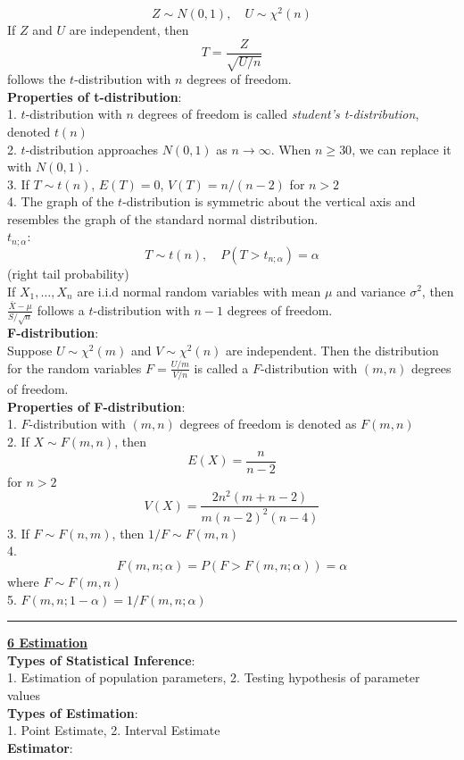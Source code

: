 \documentclass{article}
\begin{document}
\begin{multicols*}{3}
$$Z\sim N(0,1),\quad U\sim \chi^2(n)$$
If $Z$ and $U$ are independent, then $$T=\frac{Z}{\sqrt{U/n}}$$ follows the $t$-distribution with $n$ degrees of freedom.\\
\textbf{Properties of t-distribution}:\\
1. $t$-distribution with $n$ degrees of freedom is called \textit{student's t-distribution}, denoted $t(n)$\\
2. $t$-distribution approaches $N(0,1)$ as $n\to\infty$. When $n\geq 30$, we can replace it with $N(0,1)$.\\
3. If $T\sim t(n)$, $E(T)=0$, $V(T)=n/(n-2)$ for $n>2$\\
4. The graph of the $t$-distribution is symmetric about the vertical axis and resembles the graph of the standard normal distribution.\\ 
$t_{n;\alpha}$: $$T\sim t(n), \quad P(T>t_{n;\alpha})=\alpha$$ (right tail probability)\\
If $X_1,\dots,X_n$ are i.i.d normal random variables with mean $\mu$ and variance $\sigma^2$, then $\frac{\bar{X}-\mu}{S/\sqrt{n}}$ follows a $t$-distribution with $n-1$ degrees of freedom.\\
\textbf{F-distribution}:\\
Suppose $U\sim \chi^2(m)$ and $V\sim \chi^2(n)$ are independent. Then the distribution for the random variables $F=\frac{U/m}{V/n}$ is called a $F$-distribution with $(m,n)$ degrees of freedom.\\
\textbf{Properties of F-distribution}: \\
1. $F$-distribution with $(m,n)$ degrees of freedom is denoted as $F(m,n)$\\
2. If $X\sim F(m,n)$, then $$E(X)=\frac{n}{n-2}$$ for $n>2$ 
$$V(X)=\frac{2n^2(m+n-2)}{m(n-2)^2(n-4)}$$
3. If $F\sim F(n,m)$, then $1/F\sim F(m,n)$\\
4. $$F(m,n;\alpha)=P(F>F(m,n;\alpha))=\alpha$$ where $F\sim F(m,n)$\\
5. $F(m,n;1-\alpha)=1/F(m,n;\alpha)$\\
\rule{193pt}{0.2pt}
\textbf{\underline{6 Estimation}}\\
\textbf{Types of Statistical Inference}:\\
1. Estimation of population parameters, 2. Testing hypothesis of parameter values\\
\textbf{Types of Estimation}: \\
1. Point Estimate, 2. Interval Estimate\\
\textbf{Estimator}: \\

\end{multicols*}
\end{document}
